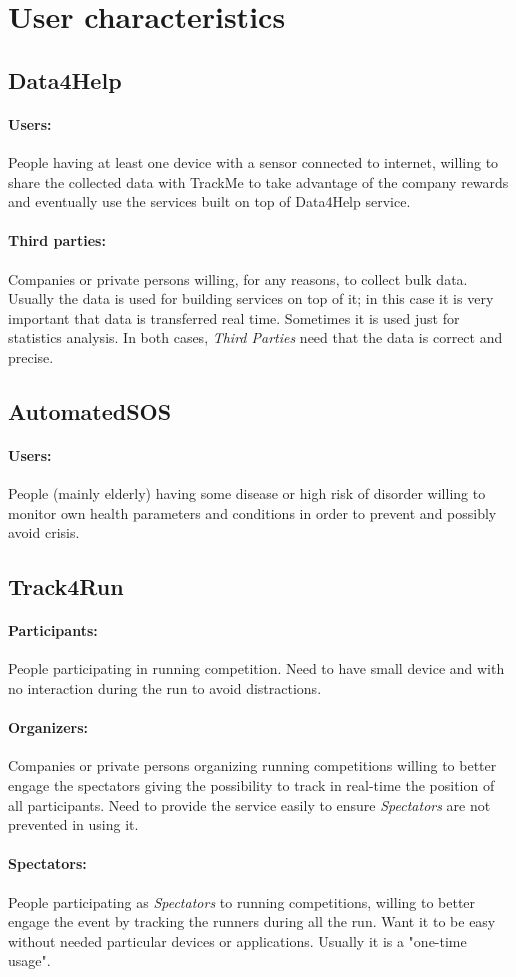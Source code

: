 \documentclass[../../rasd.tex]{subfiles}
\begin{document}
\section{User characteristics}
			\subsection{Data4Help}
				\paragraph{Users:}
				People having at least one device with a sensor connected to internet, willing to share the collected data with TrackMe to take advantage of the company rewards and eventually use the services built on top of Data4Help service.
				\paragraph{Third parties:}
				Companies or private persons willing, for any reasons, to collect bulk data. Usually the data is used for building services on top of it; in this case it is very important that data is transferred real time. Sometimes it is used just for statistics analysis. In both cases, \textit{Third Parties} need that the data is correct and precise. 
			\subsection{AutomatedSOS}
				\paragraph{Users:}
				People (mainly elderly) having some disease or high risk of disorder willing to monitor own health parameters and conditions in order to prevent and possibly avoid crisis.
			\subsection{Track4Run}
				\paragraph{Participants:}
				People participating in running competition. Need to have small device and with no interaction during the run to avoid distractions.
				\paragraph{Organizers:}
				Companies or private persons organizing running competitions willing to better engage the spectators giving the possibility to track in real-time the position of all participants. Need to provide the service easily to ensure \textit{Spectators} are not prevented in using it.
				\paragraph{Spectators:}
				People participating as \textit{Spectators} to running competitions, willing to better engage the event by tracking the runners during all the run. Want it to be easy without needed particular devices or applications. Usually it is a "one-time usage".
\end{document}
